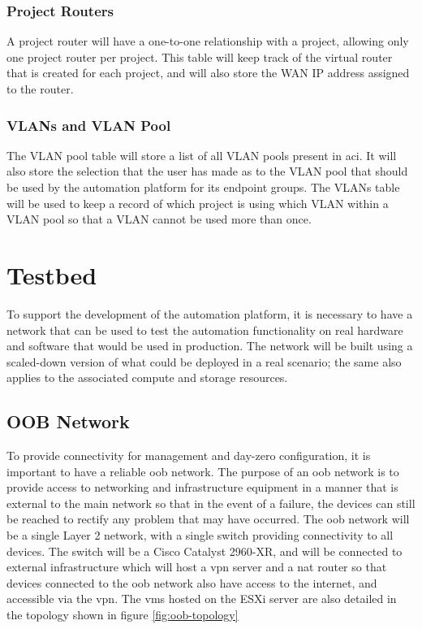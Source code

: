 \subsubsection{Project Routers}
\label{design:web-application:database:project-routers}
A project router will
have a one-to-one relationship with a project, allowing only one project router
per project. This table will keep track of the virtual router that is created
for each project, and will also store the WAN IP address assigned to the
router.

\subsubsection{VLANs and VLAN Pool}
\label{design:web-application:database:vlan-and-vlan-pool}
The VLAN pool table
will store a list of all VLAN pools present in \gls{aci}. It will also store
the selection that the user has made as to the VLAN pool that should be used by
the automation platform for its endpoint groups. The VLANs table will be used
to keep a record of which project is using which VLAN within a VLAN pool so
that a VLAN cannot be used more than once.

\section{Testbed}
\label{design:Testbed}
To support the development of the automation platform,
it is necessary to have a network that can be used to test the automation
functionality on real hardware and software that would be used in production.
The network will be built using a scaled-down version of what could be deployed
in a real scenario; the same also applies to the associated compute and storage
resources.

\subsection{OOB Network}
\label{design:Testbed:network-design:oob}
To provide connectivity for management and day-zero configuration, it is
important to have a reliable \gls{oob} network. The purpose of an \gls{oob}
network is to provide access to networking and infrastructure equipment in a manner that is external
to the main network so that in the event of a failure, the devices can still be
reached to rectify any problem that may have occurred. The \gls{oob} network
will be a single Layer 2 network, with a single switch providing connectivity
to all devices. The switch will be a Cisco Catalyst 2960-XR, and will be
connected to external infrastructure which will host a \gls{vpn} server and a
\gls{nat} router so that devices connected to the \gls{oob} network also have
access to the internet, and accessible via the \gls{vpn}. The \gls{vm}s hosted on the ESXi server are also
detailed in the topology shown in figure \ref{fig:oob-topology}

